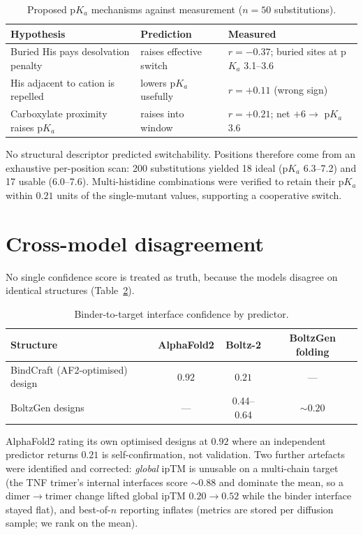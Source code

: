 \documentclass[11pt,a4paper]{article}
\begin{document}
\begin{table}[htbp]
\centering
\caption{Proposed p$K_a$ mechanisms against measurement ($n=50$ substitutions).}
\label{tab:pka}
\begin{tabular}{lll}
\toprule
Hypothesis & Prediction & Measured \\
\midrule
Buried His pays desolvation penalty & raises effective switch & $r=-0.37$; buried sites at p$K_a$ 3.1--3.6 \\
His adjacent to cation is repelled & lowers p$K_a$ usefully & $r=+0.11$ (wrong sign) \\
Carboxylate proximity raises p$K_a$ & raises into window & $r=+0.21$; net $+6 \rightarrow$ p$K_a$ 3.6 \\
\bottomrule
\end{tabular}
\end{table}

No structural descriptor predicted switchability. Positions therefore come from an exhaustive
per-position scan: 200 substitutions yielded 18 ideal (p$K_a$ 6.3--7.2) and 17 usable
(6.0--7.6). Multi-histidine combinations were verified to retain their p$K_a$ within
$0.21$ units of the single-mutant values, supporting a cooperative switch.

\section{Cross-model disagreement}

No single confidence score is treated as truth, because the models disagree on identical
structures (Table~\ref{tab:models}).

\begin{table}[htbp]
\centering
\caption{Binder-to-target interface confidence by predictor.}
\label{tab:models}
\begin{tabular}{lccc}
\toprule
Structure & AlphaFold2 & Boltz-2 & BoltzGen folding \\
\midrule
BindCraft (AF2-optimised) design & $\mathbf{0.92}$ & $\mathbf{0.21}$ & --- \\
BoltzGen designs & --- & 0.44--0.64 & $\sim 0.20$ \\
\bottomrule
\end{tabular}
\end{table}

AlphaFold2 rating its own optimised designs at $0.92$ where an independent predictor returns
$0.21$ is self-confirmation, not validation. Two further artefacts were identified and
corrected: \emph{global} ipTM is unusable on a multi-chain target (the TNF trimer's internal
interfaces score $\sim 0.88$ and dominate the mean, so a dimer$\rightarrow$trimer change lifted
global ipTM $0.20 \rightarrow 0.52$ while the binder interface stayed flat), and best-of-$n$
reporting inflates (metrics are stored per diffusion sample; we rank on the mean).
\end{document}
